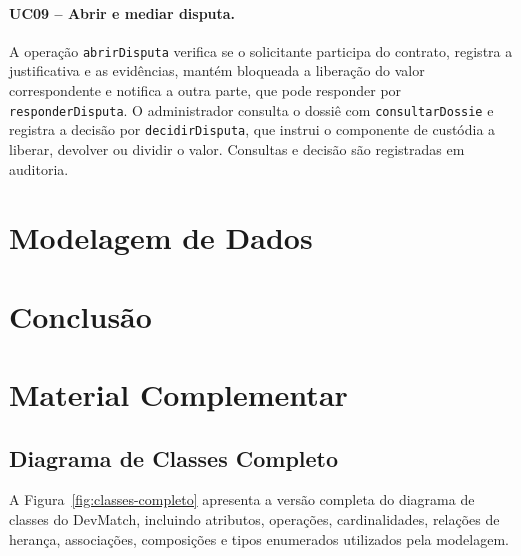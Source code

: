 \documentclass[portuguese]{sbcreviews-2025}
\begin{document}
\paragraph{UC09 -- Abrir e mediar disputa.}

A operação \texttt{abrirDisputa} verifica se o solicitante
participa do contrato, registra a justificativa e as evidências,
mantém bloqueada a liberação do valor correspondente e notifica a
outra parte, que pode responder por \texttt{responderDisputa}. O
administrador consulta o dossiê com \texttt{consultarDossie} e
registra a decisão por \texttt{decidirDisputa}, que instrui o
componente de custódia a liberar, devolver ou dividir o valor.
Consultas e decisão são registradas em auditoria.


\section{Modelagem de Dados}
\label{sec:modelagem-dados}



\section{Conclusão}
\label{sec:conclusao}


\appendix

\section{Material Complementar}
\label{ap:material}

\subsection{Diagrama de Classes Completo}
\label{ap:classes-completo}

A Figura~\ref{fig:classes-completo} apresenta a versão completa do
diagrama de classes do DevMatch, incluindo atributos, operações,
cardinalidades, relações de herança, associações, composições e
tipos enumerados utilizados pela modelagem.
\end{document}
